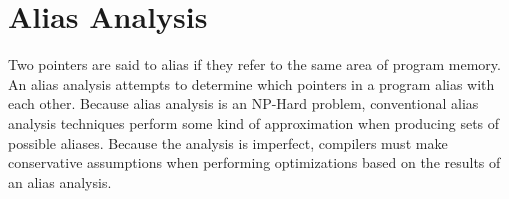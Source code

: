 \section{Alias Analysis}
Two pointers are said to alias if they refer to the same area of program memory. An alias analysis attempts to determine which pointers in a program alias with each other. Because alias analysis is an NP-Hard problem, conventional alias analysis techniques perform some kind of approximation when producing sets of possible aliases. Because the analysis is imperfect, compilers must make conservative assumptions when performing optimizations based on the results of an alias analysis.
